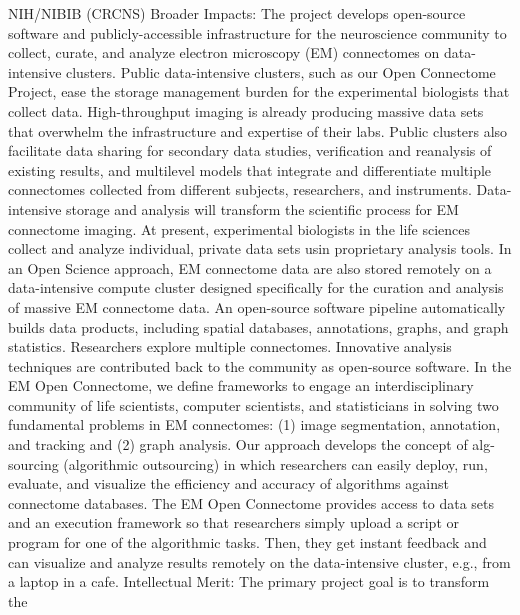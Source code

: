 \documentclass[10pt,colorlinks=true,urlcolor=blue]{moderncv}
\begin{document}

	{NIH/NIBIB (CRCNS)}
	{
	Broader Impacts: The project develops open-source software and
publicly-accessible infrastructure for the neuroscience community to collect,
curate, and analyze electron microscopy (EM) connectomes on data-intensive
clusters. Public data-intensive clusters, such as our Open Connectome Project,
ease the storage management burden for the experimental biologists that collect
data. High-throughput imaging is already producing massive data sets that
overwhelm the infrastructure and expertise of their labs. Public clusters also
facilitate data sharing for secondary data studies, verification and reanalysis
of existing results, and multilevel models that integrate and differentiate
multiple connectomes collected from different subjects, researchers, and
instruments. Data-intensive storage and analysis will transform the scientific
process for EM connectome imaging. At present, experimental biologists in the
life sciences collect and analyze individual, private data sets usin
proprietary analysis tools. In an Open Science approach, EM connectome data are
also stored remotely on a data-intensive compute cluster designed specifically
for the curation and analysis of massive EM connectome data. An open-source
software pipeline automatically builds data products, including spatial
databases, annotations, graphs, and graph statistics. Researchers explore
multiple connectomes. Innovative analysis techniques are contributed back to
the community as open-source software. In the EM Open Connectome, we define
frameworks to engage an interdisciplinary community of life scientists,
computer scientists, and statisticians in solving two fundamental problems in
EM connectomes: (1) image segmentation, annotation, and tracking and (2) graph
analysis. Our approach develops the concept of alg-sourcing (algorithmic
outsourcing) in which researchers can easily deploy, run, evaluate, and
visualize the efficiency and accuracy of algorithms against connectome
databases. The EM Open Connectome provides access to data sets and an execution
framework so that researchers simply upload a script or program for one of the
algorithmic tasks. Then, they get instant feedback and can visualize and
analyze results remotely on the data-intensive cluster, e.g., from a laptop in
a cafe. Intellectual Merit: The primary project goal is to transform the
}
\end{document}
